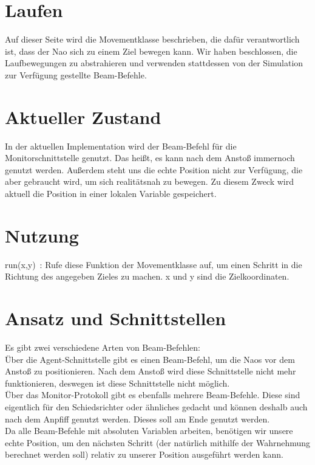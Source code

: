 \section{Laufen}
Auf dieser Seite wird die Movementklasse beschrieben, die dafür 
verantwortlich ist, dass der Nao sich zu einem Ziel bewegen kann. Wir 
haben beschlossen, die Laufbewegungen zu abstrahieren und verwenden 
stattdessen von der Simulation zur Verfügung gestellte Beam-Befehle.

\section{Aktueller Zustand}
In der aktuellen Implementation wird der Beam-Befehl für die 
Monitorschnittstelle genutzt. Das heißt, es kann nach dem Anstoß immernoch genutzt werden. Außerdem steht uns die echte Position nicht zur 
Verfügung, die aber gebraucht wird, um sich realitätsnah zu bewegen. Zu 
diesem Zweck wird aktuell die Position in einer lokalen Variable 
gespeichert.

\section{Nutzung}
run(x,y)~: Rufe diese Funktion der Movementklasse auf, um einen 
Schritt in die Richtung des angegeben Zieles zu machen. x und y sind die
 Zielkoordinaten.

\section{Ansatz und Schnittstellen}
Es gibt zwei verschiedene Arten von Beam-Befehlen: \\
Über die Agent-Schnittstelle gibt es einen Beam-Befehl, um die 
Naos vor dem Anstoß zu positionieren. Nach dem Anstoß wird diese 
Schnittstelle nicht mehr funktionieren, deswegen ist diese Schnittstelle 
nicht möglich.\\
Über das Monitor-Protokoll gibt es ebenfalls mehrere 
Beam-Befehle. Diese sind eigentlich für den Schiedsrichter oder 
ähnliches gedacht und können deshalb auch nach dem Anpfiff genutzt 
werden. Dieses soll am Ende genutzt werden.\\
Da alle Beam-Befehle mit absoluten Variablen arbeiten, benötigen 
wir unsere echte Position, um den nächsten Schritt (der natürlich 
mithilfe der Wahrnehmung berechnet werden soll) relativ zu unserer 
Position ausgeführt werden kann.

